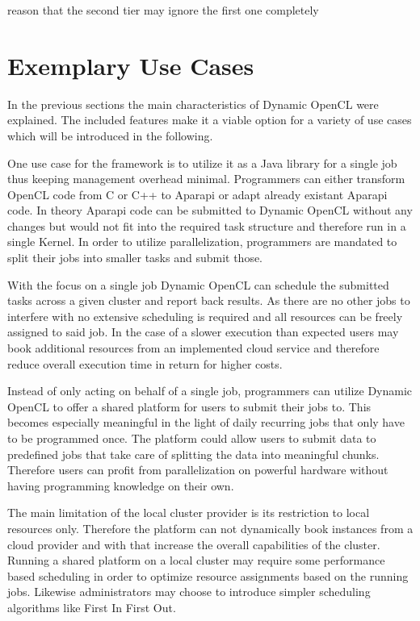 reason that the second tier may ignore the first one completely
\section{Exemplary Use Cases}

In the previous sections the main characteristics of Dynamic OpenCL were explained. The included features make it a viable option for a variety of use cases which will be introduced in the following.

\begin{description}[style=nextline]
	\item[Job Based Library]
	One use case for the framework is to utilize it as a Java library for a single job thus keeping management overhead minimal. Programmers can either transform OpenCL code from C or C++ to Aparapi or adapt already existant Aparapi code. In theory Aparapi code can be submitted to Dynamic OpenCL without any changes but would not fit into the required task structure and therefore run in a single Kernel. In order to utilize parallelization, programmers are mandated to split their jobs into smaller tasks and submit those.
	
	With the focus on a single job Dynamic OpenCL can schedule the submitted tasks across a given cluster and report back results. As there are no other jobs to interfere with no extensive scheduling is required and all resources can be freely assigned to said job. In the case of a slower execution than expected users may book additional resources from an implemented cloud service and therefore reduce overall execution time in return for higher costs.
	
	\item[Local Cluster Provider] 
	
	Instead of only acting on behalf of a single job, programmers can utilize Dynamic OpenCL to offer a shared platform for users to submit their jobs to. This becomes especially meaningful in the light of daily recurring jobs that only have to be programmed once. The platform could allow users to submit data to predefined jobs that take care of splitting the data into meaningful chunks. Therefore users can profit from parallelization on powerful hardware without having programming knowledge on their own.
	
	The main limitation of the local cluster provider is its restriction to local resources only. Therefore the platform can not dynamically book instances from a cloud provider and with that increase the overall capabilities of the cluster. Running a shared platform on a local cluster may require some performance based scheduling in order to optimize resource assignments based on the running jobs. Likewise administrators may choose to introduce simpler scheduling algorithms like First In First Out. 
	

\end{description}
